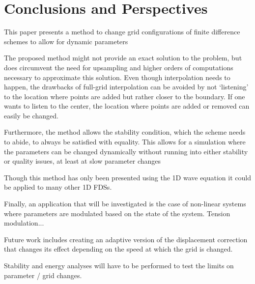 \section{Conclusions and Perspectives}\label{sec:conclusion}
This paper presents a method to change grid configurations of finite difference schemes to allow for dynamic parameters


The proposed method might not provide an exact solution to the problem, but does circumvent the need for upsampling and higher orders of computations necessary to approximate this solution. Even though interpolation needs to happen, the drawbacks of full-grid interpolation can be avoided by not `listening' to the location where points are added but rather closer to the boundary. If one wants to listen to the center, the location where points are added or removed can easily be changed.

Furthermore, the method allows the stability condition, which the scheme needs to abide, to always be satisfied with equality. This allows for a simulation where the parameters can be changed dynamically without running into either stability or quality issues, at least at slow parameter changes

Though this method has only been presented using the 1D wave equation it could be applied to many other 1D FDSs. 


Finally, an application that will be investigated is the case of non-linear systems where parameters are modulated based on the state of the system. Tension modulation...


Future work includes creating an adaptive version of the displacement correction that changes its effect depending on the speed at which the grid is changed.

Stability and energy analyses will have to be performed to test the limits on parameter / grid changes.
